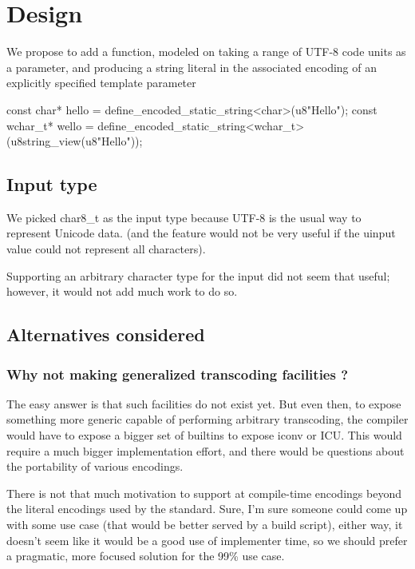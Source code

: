 \documentclass{wg21}
\begin{document}
\section{Design}

We propose to add a  function, modeled on 
taking a range of UTF-8 code units as a parameter, and producing a string literal in the associated encoding of an explicitly specified
template parameter

\begin{colorblock}
const char* hello = define_encoded_static_string<char>(u8"Hello");
const wchar_t* wello = define_encoded_static_string<wchar_t>(u8string_view(u8"Hello"));
\end{colorblock}

\subsection{Input type}

We picked char8_t as the input type because UTF-8 is the usual way to represent Unicode data.
(and the feature would not be very useful if the uinput value could not represent all characters).

Supporting an arbitrary character type for the input did not seem that useful; however, it would not add much work to do so.

\subsection{Alternatives considered}

\subsubsection{Why not making generalized transcoding facilities ?}

The easy answer is that such facilities do not exist yet.
But even then, to expose something more generic capable of performing arbitrary transcoding,
the compiler would have to expose a bigger set of builtins to expose iconv or ICU.
This would require a much bigger implementation effort, and there would be questions about the portability of various encodings.

There is not that much motivation to support at compile-time encodings beyond the literal encodings used by the standard.
Sure, I'm sure someone could come up with some use case (that would be better served by a build script), either way, it doesn't seem like it
would be a good use of implementer time, so we should prefer a pragmatic, more focused solution for the 99\% use case.
\end{document}

